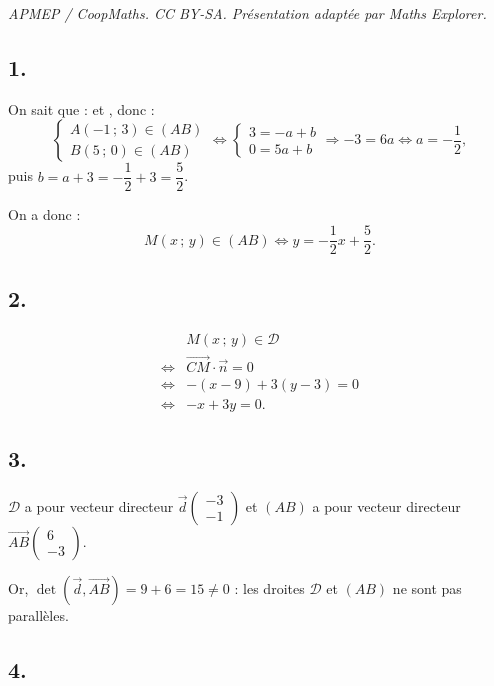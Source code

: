 \documentclass[10pt]{article}
\begin{document}
\noindent\textit{APMEP / CoopMaths. CC BY-SA. Présentation adaptée par Maths Explorer.}\par\medskip
\subsection*{1.}

On sait que :  et , donc :
\[
\begin{cases}
A(-1\,;\,3) \in (AB) \\
B(5\,;\,0) \in (AB)
\end{cases}
\iff
\begin{cases}
3 = -a + b \\
0 = 5a + b
\end{cases}
\Rightarrow -3 = 6a \iff a = -\dfrac{1}{2},
\]
puis \( b = a + 3 = -\dfrac{1}{2} + 3 = \dfrac{5}{2} \).

On a donc :
\[
M(x\,;\,y) \in (AB) \iff y = -\dfrac{1}{2}x + \dfrac{5}{2}.
\]

\subsection*{2.}

\begin{align*}
&M(x\,;\,y) \in \mathcal{D} \\
\iff &\overrightarrow{CM} \cdot \vec{n} = 0 \\
\iff &- (x - 9) + 3(y - 3) = 0 \\
\iff& -x + 3y = 0.
\end{align*}

\subsection*{3.}

\( \mathcal{D} \) a pour vecteur directeur \( \vec{d} \begin{pmatrix} -3 \\ -1 \end{pmatrix} \) et \( (AB) \) a pour vecteur directeur \( \overrightarrow{AB} \begin{pmatrix} 6 \\ -3 \end{pmatrix} \).

Or, \( \det\left(\vec{d}, \overrightarrow{AB}\right) = 9 + 6 = 15 \neq 0 \) : les droites \( \mathcal{D} \) et \( (AB) \) ne sont pas parallèles.

\subsection*{4.}
\end{document}
